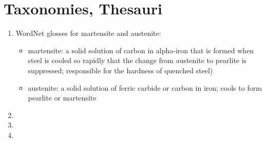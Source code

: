 \documentclass[12pt]{report}
\begin{document}
\section{Taxonomies, Thesauri}
\begin{enumerate}
  \item WordNet glosses for martensite and austenite:
  \begin{itemize}
    \item martensite: a solid solution of carbon in alpha-iron that is formed
    when steel is cooled so rapidly that the change from austenite to pearlite
    is suppressed; responsible for the hardness of quenched steel)
    \item austenite: a solid solution of ferric carbide or carbon in iron;
    cools to form pearlite or martensite
  \end{itemize}
  \item
  \item
  \item
\end{enumerate}
\end{document}
